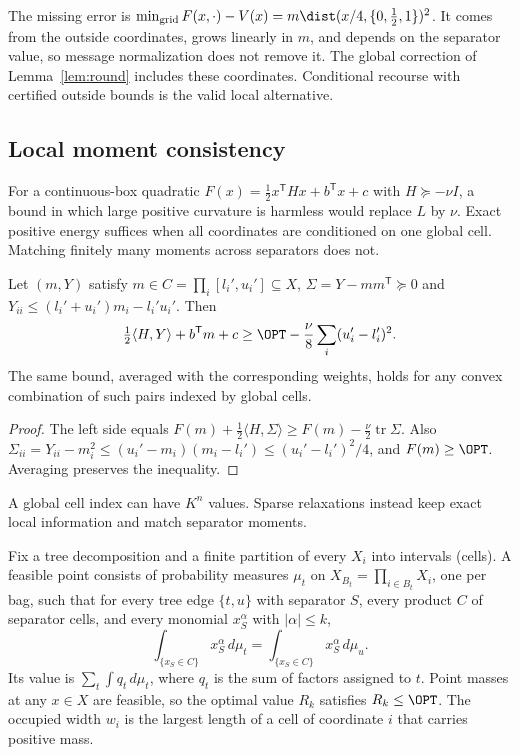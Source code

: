 The missing error is $\min_{\rm grid}F(x,\cdot)-V(x)=m\dist(x/4,\{0,\tfrac12,
1\})^2$. It comes from the outside coordinates, grows linearly in $m$, and
depends on the separator value, so message normalization does not remove it.
The global correction of Lemma~\ref{lem:round} includes these coordinates.
Conditional recourse with certified outside bounds is the valid local
alternative.

\subsection{Local moment consistency}\label{sec:limits-moments}

For a continuous-box quadratic $F(x)=\frac12x^{\mathsf T}Hx+b^{\mathsf T}x+c$
with $H\succeq-\nu I$, a bound in which large positive curvature is harmless
would replace $L$ by $\nu$. Exact positive energy suffices when all
coordinates are conditioned on one global cell. Matching finitely many
moments across separators does not.

\begin{lemma}\label{lim:lem:mixture}
Let $(m,Y)$ satisfy $m\in C=\prod_i[l_i',u_i']\subseteq X$,
$\Sigma=Y-mm^{\mathsf T}\succeq0$ and $Y_{ii}\le(l_i'+u_i')m_i-l_i'u_i'$.
Then
\[
\tfrac12\langle H,Y\rangle+b^{\mathsf T}m+c\ge\OPT-\frac\nu8
\sum_i(u_i'-l_i')^2 .
\]
The same bound, averaged with the corresponding weights, holds for any
convex combination of such pairs indexed by global cells.
\end{lemma}

\begin{proof}
The left side equals
$F(m)+\frac12\langle H,\Sigma\rangle\ge F(m)-\frac\nu2\operatorname{tr}\Sigma$.
Also $\Sigma_{ii}=Y_{ii}-m_i^2\le(u_i'-m_i)(m_i-l_i')\le(u_i'-l_i')^2/4$, and
$F(m)\ge\OPT$. Averaging preserves the inequality.
\end{proof}

A global cell index can have $K^n$ values. Sparse relaxations instead keep
exact local information and match separator moments.

\begin{definition}
\label{lim:def:moments}
Fix a tree decomposition and a finite partition of every $X_i$ into
intervals (cells). A feasible point consists of probability measures
$\mu_t$ on $X_{B_t}=\prod_{i\in B_t}X_i$, one per bag, such that for every
tree edge $\{t,u\}$ with separator $S$, every product $C$ of separator cells,
and every monomial $x_S^\alpha$ with $|\alpha|\le k$,
\[
\int_{\{x_S\in C\}}x_S^\alpha\,d\mu_t=\int_{\{x_S\in C\}}x_S^\alpha\,d\mu_u .
\]
Its value is $\sum_t\int q_t\,d\mu_t$, where $q_t$ is the sum of factors
assigned to $t$. Point masses at any $x\in X$ are feasible, so the optimal
value $R_k$ satisfies $R_k\le\OPT$. The occupied width $w_i$ is the largest
length of a cell of coordinate $i$ that carries positive mass.
\end{definition}

